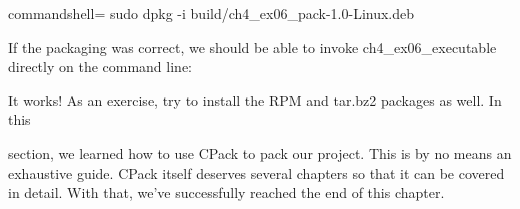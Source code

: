 \begin{tcblisting}{commandshell={}}
sudo dpkg -i build/ch4_ex06_pack-1.0-Linux.deb
\end{tcblisting}

If the packaging was correct, we should be able to invoke ch4\_ex06\_executable directly on the command line:


It works! As an exercise, try to install the RPM and tar.bz2 packages as well. In this

section, we learned how to use CPack to pack our project. This is by no means an exhaustive guide. CPack itself deserves several chapters so that it can be covered in detail. With that, we've successfully reached the end of this chapter.








